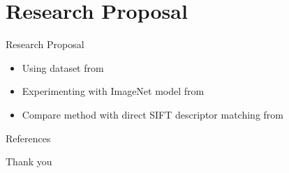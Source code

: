 \documentclass[10pt]{beamer}
\begin{document}
\section{Research Proposal}

\begin{frame}{Research Proposal}

	
	\begin{itemize}
		\item Using dataset from \cite{menzata2014sistem}
		\item Experimenting with ImageNet model from \cite{simonyan2014very}
		\item Compare method with direct SIFT descriptor matching from \cite{willy2013evaluation}
	\end{itemize}

\end{frame}

\begin{frame}[allowframebreaks]{References}
  
  
\end{frame}

\begin{frame}[standout]
  Thank you
\end{frame}


%
%

\end{document}
